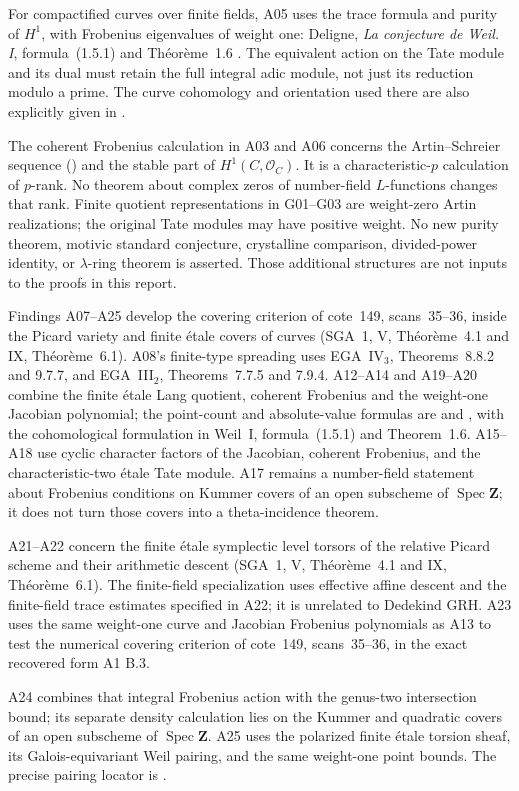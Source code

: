 For compactified curves over finite fields, A05 uses the trace
formula and purity of $H^1$, with Frobenius eigenvalues of weight one:
Deligne, \emph{La conjecture de Weil. I}, formula~(1.5.1) and
Th\'eor\`eme~1.6 \cite{WeilI}. The equivalent action on the
Tate module and its dual must retain the full integral adic module,
not just its reduction modulo a prime. The curve cohomology and
orientation used there are also explicitly given in
\cite[Proposition~14.2 and Remark~14.10]{MilneLEC}.

The coherent Frobenius calculation in A03 and A06 concerns the
Artin--Schreier sequence (\cite[Example~7.9(b)]{MilneLEC}) and the stable part of $H^1(C,\mathcal O_C)$.
It is a characteristic-$p$ calculation of $p$-rank. No theorem about
complex zeros of number-field $L$-functions changes that rank.
Finite quotient representations in G01--G03 are weight-zero Artin
realizations; the original Tate modules may have positive weight.
No new purity theorem, motivic standard conjecture, crystalline
comparison, divided-power identity, or $\lambda$-ring theorem is
asserted. Those additional structures are not inputs to the proofs
in this report.


Findings A07--A25 develop the covering criterion of cote~149,
scans~35--36, inside the Picard variety and finite \'etale covers of
curves (SGA~1, V, Th\'eor\`eme~4.1 and IX, Th\'eor\`eme~6.1).
A08's finite-type spreading uses EGA~IV$_3$, Theorems~8.8.2 and
9.7.7, and EGA~III$_2$, Theorems~7.7.5 and 7.9.4.
A12--A14 and A19--A20 combine the finite \'etale Lang quotient,
coherent Frobenius and the weight-one Jacobian polynomial; the
point-count and absolute-value formulas are
\cite[Theorem~19.1(a)--(c)]{MilneAV} and
\cite[Theorem~11.1]{MilneJV}, with the cohomological formulation
in Weil~I, formula~(1.5.1) and Theorem~1.6.
A15--A18 use cyclic character factors of the Jacobian, coherent
Frobenius, and the characteristic-two \'etale Tate module.
A17 remains a number-field statement about Frobenius conditions
on Kummer covers of an open subscheme of $\operatorname{Spec}\mathbf Z$;
it does not turn those covers into a theta-incidence theorem.

A21--A22 concern the finite \'etale symplectic level torsors of the
relative Picard scheme and their arithmetic descent (SGA~1, V,
Th\'eor\`eme~4.1 and IX, Th\'eor\`eme~6.1). The finite-field
specialization uses effective affine descent and the finite-field
trace estimates specified in A22; it is unrelated to Dedekind GRH.
A23 uses the same weight-one curve and Jacobian Frobenius polynomials
as A13 to test the numerical covering criterion of cote~149,
scans~35--36, in the exact recovered form A1 B.3.

A24 combines that integral Frobenius action with the genus-two
intersection bound; its separate density calculation lies on the
Kummer and quadratic covers of an open subscheme of
$\operatorname{Spec}\mathbf Z$. A25 uses the polarized finite
\'etale torsion sheaf, its Galois-equivariant Weil pairing, and
the same weight-one point bounds. The precise pairing locator is
\cite[\S16 and Lemma~16.2(e)]{MilneAV}.
